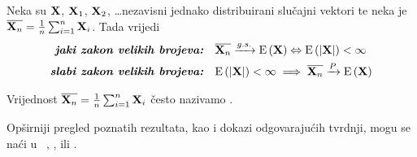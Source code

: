 \begin{tm}
\label{tm:zvb}
	Neka su $\tsvek{X}$, $\tsvek{X}_1$, $\tsvek{X}_2$, \ldots nezavisni jednako
	distribuirani slučajni vektori te neka je
	$\overline{\tsvek{X}_n} = \frac{1}{n} \sum_{i=1}^{n} \tsvek{X}_i$.
	Tada vrijedi
	\begin{align}
		\text{\be{jaki zakon velikih brojeva:}}
		\quad &
		\konvgs{\overline{\tsvek{X}_n}}{\vE{\tsvek{X}}}
		\Leftrightarrow
		\vE{|\tsvek{X}|} < \infty
		\\
		\text{\be{slabi zakon velikih brojeva:}}
		\quad & 
		\vE{|\tsvek{X}|} < \infty
		\implies
		\konvpv{\overline{\tsvek{X}_n}}{\vE{\tsvek{X}}}
	\end{align}
\end{tm}

\noindent
Vrijednost 
$\overline{\tsvek{X}_n} = \frac{1}{n} \sum_{i=1}^{n} \tsvek{X}_i$
često nazivamo
.

Opširniji pregled poznatih rezultata,
kao i dokazi odgovarajućih tvrdnji, mogu
se naći u ~\textcite{ferguson_course_1996},
\textcite{sarapa2002vjerojatnost},
\textcite{shiryaev1995probability}
ili
\textcite{allan2012probability}.

